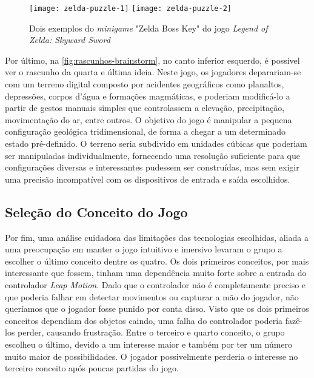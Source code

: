 \begin{figure}[h]
	\centering
	\caption{Dois exemplos do \textit{minigame} "Zelda Boss Key" do jogo \textit{Legend of Zelda: Skyward Sword}}
	\texttt{[image: zelda-puzzle-1]}
	\texttt{[image: zelda-puzzle-2]}
	\label{fig:zelda-key-puzzle}
\end{figure}

Por último, na \autoref{fig:rascunhos-brainstorm}, no canto inferior esquerdo,
é possível ver o rascunho da quarta e última ideia. Neste jogo, os 
jogadores deparariam-se com um terreno digital composto por acidentes
geográficos como planaltos, depressões, corpos d'água e formações magmáticas, 
e poderiam modificá-lo a partir de gestos manuais simples que controlassem 
a elevação, precipitação, movimentação do ar, entre outros. O objetivo do jogo
é manipular a pequena configuração geológica tridimensional, de forma a chegar 
a um determinado estado pré-definido. O terreno seria subdivido em unidades 
cúbicas que poderiam ser manipuladas individualmente, fornecendo uma 
resolução suficiente para que configurações diversas e interessantes pudessem 
ser construídas, mas sem exigir uma precisão incompatível com os dispositivos 
de entrada e saída escolhidos.

\subsection{Seleção do Conceito do Jogo}\label{subsec-selecao-conceito}

Por fim, uma análise cuidadosa das limitações das tecnologias escolhidas, aliada 
a uma preocupação em manter o jogo intuitivo e imersivo levaram o grupo a 
escolher o último conceito dentre os quatro. Os dois primeiros conceitos, por 
mais interessante que fossem, tinham uma dependência muito forte sobre a
entrada do controlador \textit{Leap Motion}. Dado que o controlador não 
é completamente preciso e que poderia falhar em detectar movimentos ou 
capturar a mão do jogador, não queríamos que o jogador fosse punido por conta 
disso. Visto que os dois primeiros conceitos dependiam dos objetos caindo, 
uma falha do controlador poderia fazê-los perder, causando frustração. 
Entre o terceiro e quarto conceito, o grupo escolheu o último, devido a 
um interesse maior e também por ter um número muito maior de 
possibilidades. O jogador possivelmente perderia o interesse no terceiro 
conceito após poucas partidas do jogo.

